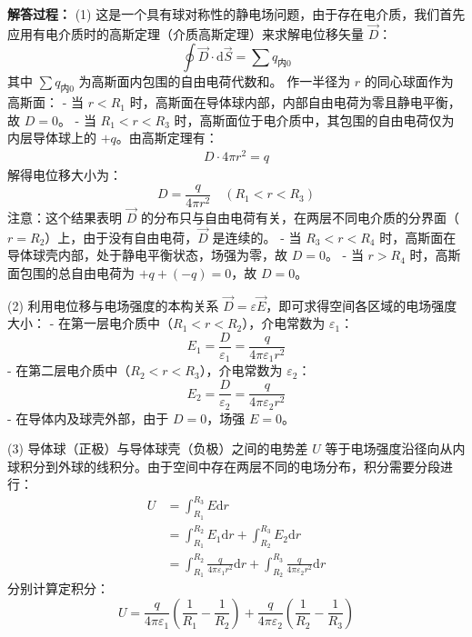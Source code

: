 \begin{enumerate}
	\textbf{解答过程： }
	(1) 这是一个具有球对称性的静电场问题，由于存在电介质，我们首先应用有电介质时的高斯定理（介质高斯定理）来求解电位移矢量 $\vec{D}$：
	\begin{equation}\label{eq:L8-2-1}
		\oint \vec{D} \cdot \mathrm{d}\vec{S} = \sum q_{\text{内0}}
	\end{equation}
	其中 $\sum q_{\text{内0}}$ 为高斯面内包围的自由电荷代数和。
	作一半径为 $r$ 的同心球面作为高斯面：
	- 当 $r < R_1$ 时，高斯面在导体球内部，内部自由电荷为零且静电平衡，故 $D = 0$。
	- 当 $R_1 < r < R_3$ 时，高斯面位于电介质中，其包围的自由电荷仅为内层导体球上的 $+q$。由高斯定理有：
	\begin{align*}
		D \cdot 4\pi r^2 = q
	\end{align*}
	解得电位移大小为：
	\begin{equation}\label{eq:L8-2-2}
		D = \frac{q}{4\pi r^2} \quad (R_1 < r < R_3)
	\end{equation}
	注意：这个结果表明 $\vec{D}$ 的分布只与自由电荷有关，在两层不同电介质的分界面（$r = R_2$）上，由于没有自由电荷，$\vec{D}$ 是连续的。
	- 当 $R_3 < r < R_4$ 时，高斯面在导体球壳内部，处于静电平衡状态，场强为零，故 $D = 0$。
	- 当 $r > R_4$ 时，高斯面包围的总自由电荷为 $+q + (-q) = 0$，故 $D = 0$。
	
	(2) 利用电位移与电场强度的本构关系 $\vec{D} = \varepsilon \vec{E}$，即可求得空间各区域的电场强度大小：
	- 在第一层电介质中（$R_1 < r < R_2$），介电常数为 $\varepsilon_1$：
	\begin{equation}\label{eq:L8-2-3}
		E_1 = \frac{D}{\varepsilon_1} = \frac{q}{4\pi\varepsilon_1 r^2}
	\end{equation}
	- 在第二层电介质中（$R_2 < r < R_3$），介电常数为 $\varepsilon_2$：
	\begin{equation}\label{eq:L8-2-4}
		E_2 = \frac{D}{\varepsilon_2} = \frac{q}{4\pi\varepsilon_2 r^2}
	\end{equation}
	- 在导体内及球壳外部，由于 $D=0$，场强 $E=0$。
	
	(3) 导体球（正极）与导体球壳（负极）之间的电势差 $U$ 等于电场强度沿径向从内球积分到外球的线积分。由于空间中存在两层不同的电场分布，积分需要分段进行：
	\begin{align*}
		U &= \int_{R_1}^{R_3} E \mathrm{d}r \\
		&= \int_{R_1}^{R_2} E_1 \mathrm{d}r + \int_{R_2}^{R_3} E_2 \mathrm{d}r \\
		&= \int_{R_1}^{R_2} \frac{q}{4\pi\varepsilon_1 r^2} \mathrm{d}r + \int_{R_2}^{R_3} \frac{q}{4\pi\varepsilon_2 r^2} \mathrm{d}r
	\end{align*}
	分别计算定积分：
	\begin{equation}\label{eq:L8-2-5}
		U = \frac{q}{4\pi\varepsilon_1} \left( \frac{1}{R_1} - \frac{1}{R_2} \right) + \frac{q}{4\pi\varepsilon_2} \left( \frac{1}{R_2} - \frac{1}{R_3} \right)
	\end{equation}
	

\end{enumerate}
